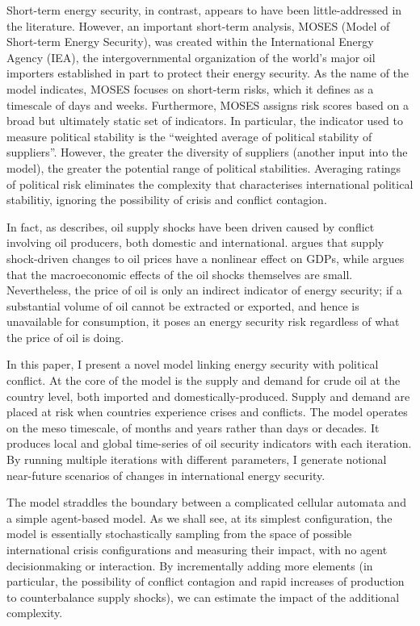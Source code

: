 \documentclass{article}
\begin{document}
Short-term energy security, in contrast, appears to have been little-addressed in the literature. However, an important short-term analysis, MOSES (Model of Short-term Energy Security), was created within the International Energy Agency (IEA), the intergovernmental organization of the world's major oil importers established in part to protect their energy security. As the name of the model indicates, MOSES focuses on short-term risks, which it defines as a timescale of days and weeks. Furthermore, MOSES assigns risk scores based on a broad but ultimately static set of indicators. In particular, the indicator used to measure political stability is the ``weighted average of political stability of suppliers''. However, the greater the diversity of suppliers (another input into the model), the greater the potential range of political stabilities. Averaging ratings of political risk eliminates the complexity that characterises international political stabilitiy, ignoring the possibility of crisis and conflict contagion. 

In fact, as \citet{hamilton_2003} describes, oil supply shocks have been driven caused by conflict involving oil producers, both domestic and international. \citet{hamilton_2003} argues that supply shock-driven changes to oil prices have a nonlinear effect on GDPs, while \citet{killian_2008} argues that the macroeconomic effects of the oil shocks themselves are small. Nevertheless, the price of oil is only an indirect indicator of energy security; if a substantial volume of oil cannot be extracted or exported, and hence is unavailable for consumption, it poses an energy security risk regardless of what the price of oil is doing. 

In this paper, I present a novel model linking energy security with political conflict. At the core of the model is the supply and demand for crude oil at the country level, both imported and domestically-produced. Supply and demand are placed at risk when countries experience crises and conflicts. The model operates on the meso timescale, of months and years rather than days or decades.  It produces local and global time-series of oil security indicators with each iteration. By running multiple iterations with different parameters, I generate notional near-future scenarios of changes in international energy security. 

The model straddles the boundary between a complicated cellular automata and a simple agent-based model. As we shall see, at its simplest configuration, the model is essentially stochastically sampling from the space of possible international crisis configurations and measuring their impact, with no agent decisionmaking or interaction. By incrementally adding more  elements (in particular, the possibility of conflict contagion and rapid increases of production to counterbalance supply shocks), we can estimate the impact of the additional complexity. 
\end{document}

